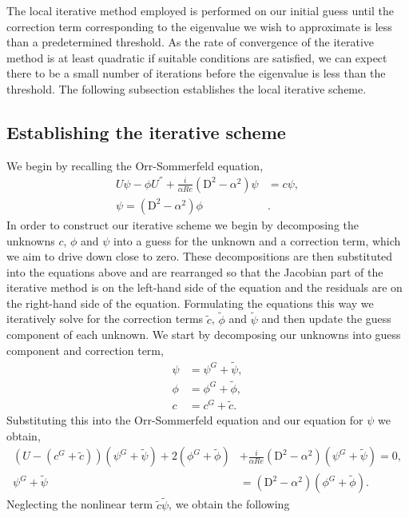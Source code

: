 \documentclass[a4paper, 12pt, twoside, openright]{article}
\numberwithin{equation}{section}
\begin{document}
The local iterative method employed is performed on our initial guess until the correction term corresponding to the eigenvalue we wish to approximate is less than a predetermined threshold. As the rate of convergence of the iterative method is at least quadratic if suitable conditions are satisfied, we can expect there to be a small number of iterations before the eigenvalue is less than the threshold. The following subsection establishes the local iterative scheme.%
\subsection{Establishing the iterative scheme}

We begin by recalling the Orr-Sommerfeld equation,
\begin{align}
U\psi - \phi U^{''} + \frac{i}{\alpha Re}\left(\mathrm{D}^2-\alpha^2\right)\psi &= c\psi,\\
\psi = \left(\mathrm{D}^2-\alpha^2\right)\phi &. 
\end{align}
In order to construct our iterative scheme we begin by decomposing the unknowns $c$, $\phi$ and $\psi$ into a guess for the unknown and a correction term, which we aim to drive down close to zero. These decompositions are then substituted into the equations above and are rearranged so that the Jacobian part of the iterative method is on the left-hand side of the equation and the residuals are on the right-hand side of the equation. Formulating the equations this way we iteratively solve for the correction terms $\tilde c$, $\tilde \phi$ and $\tilde \psi$ and then update the guess component of each unknown. We start by decomposing our unknowns into guess component and correction term,
\begin{align}
\psi &= \psi^{G} + \tilde\psi ,\\ 
\phi &= \phi^{G} + \tilde\phi, \\
c &= c^{G} + \tilde c. 
\end{align}
Substituting this into the Orr-Sommerfeld equation and our equation for $\psi$ we obtain,
\begin{align}
 (U-(c^{G} + \tilde c))(\psi^{G} + \tilde \psi) + 2(\phi^{G} + \tilde \phi)& + \frac{i}{\alpha Re}\left(\mathrm{D}^2-\alpha^2\right)\left(\psi^{G} + \tilde \psi\right) = 0,\\
 \psi^{G} + \tilde \psi &= (\mathrm{D}^2 - \alpha^2)(\phi^{G} + \tilde \phi). 
\end{align}
Neglecting the nonlinear term $\tilde c \tilde \psi$, we obtain the following
\end{document}
